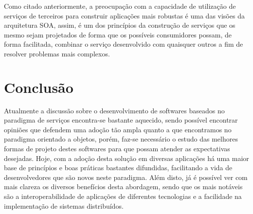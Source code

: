 \documentclass[12pt]{article}
\begin{document}
Como citado anteriormente, a preocupação com a capacidade de utilização de serviços de terceiros para construir aplicações mais robustas é uma das visões da arquitetura SOA, assim, é um dos princípios da construção de serviços que os mesmo sejam projetados de forma que os possíveis consumidores possam, de forma facilitada, combinar o serviço desenvolvido com quaisquer outros a fim de resolver problemas mais complexos.




\section{Conclusão}

Atualmente a discussão sobre o desenvolvimento de softwares baseados no paradigma de serviços encontra-se bastante aquecido, sendo possível encontrar opiniões que defendem uma adoção tão ampla quanto a que encontramos no paradigma orientado a objetos, porém, faz-se necessário o estudo das melhores formas de projeto destes softwares para que possam atender as expectativas desejadas.
Hoje, com a adoção desta solução em diversas aplicações há uma maior base de princípios e boas práticas bastantes difundidas, facilitando a vida de desenvolvedores que são novos neste paradigma.
Além disto, já é possível ver com mais clareza os diversos benefícios desta abordagem, sendo que os mais notáveis são a interoperabilidade de aplicações de diferentes tecnologias e a facilidade na implementação de sistemas distribuídos.

\nocite{elemar}
\nocite{thomas:1}
\nocite{thomas:2}



\end{document}
